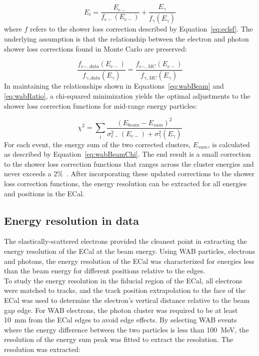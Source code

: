 \begin{equation}
	\label{eq:wabBeam}
	E_i = \dfrac{E_{e-}}{f_{e-}(E_{e-})}+\dfrac{E_{\gamma}}{f_{\gamma}(E_{\gamma})}
\end{equation}
where $f$ refers to the shower loss correction described by Equation~\eqref{eq:eclsf}. The underlying assumption is that the relationship between the electron and photon shower loss corrections found in Monte Carlo are preserved:

\begin{equation}
	\label{eq:wabRatio}
	 \dfrac{f_{e-, data}(E_{e-})}{f_{\gamma, data}(E_{\gamma})}= \dfrac{f_{e-, MC}(E_{e-})}{f_{\gamma, MC}(E_{\gamma})}
\end{equation}
In maintaining the relationships shown in Equations~\eqref{eq:wabBeam} and \eqref{eq:wabRatio}, a chi-squared minimization yields the optimal adjustments to the shower loss correction functions for mid-range energy particles:

\begin{equation}
	\label{eq:wabBeamChi}
	\chi^2 =\sum_{i} \dfrac{(E_{beam}-E_{sum})^2}{\sigma_{e-}^2(E_{e-})+\sigma_{\gamma}^2(E_{\gamma})}	
\end{equation}
For each event, the energy sum of the two corrected clusters, $E_{sum}$, is calculated as described by Equation~\eqref{eq:wabBeamChi}. The end result is a small correction to the shower loss correction functions that ranges across the cluster energies and never exceeds a 2$\%$~\cite{szumila-vance_hps_2016}. After incorporating these updated corrections to the shower loss correction functions, the energy resolution can be extracted for all energies and positions in the ECal.  

\subsection{Energy resolution in data}\label{EcalResData}
The elastically-scattered electrons provided the cleanest point in extracting the energy resolution of the ECal at the beam energy. Using WAB particles, electrons and photons, the energy resolution of the ECal was characterized for energies less than the beam energy for different positions relative to the edges.\\
\indent To study the energy resolution in the fiducial region of the ECal, all electrons were matched to tracks, and the track position extrapolation to the face of the ECal was used to determine the electron's vertical distance relative to the beam gap edge. For WAB electrons, the photon cluster was required to be at least 10~mm from the ECal edges to avoid edge effects. By selecting WAB events where the energy difference between the two particles is less than 100~MeV, the resolution of the energy sum peak was fitted to extract the resolution. The resolution was extracted:


